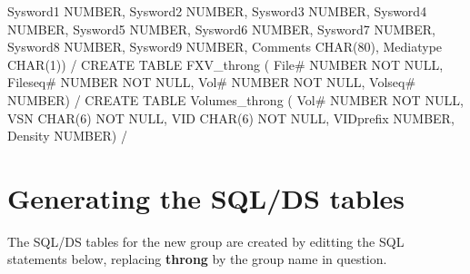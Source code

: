 \begin{Fighere}
\begin{minipage}[t]{.494\linewidth}
\begin{XMP}
                            Sysword1 NUMBER,
                            Sysword2 NUMBER,
                            Sysword3 NUMBER,
                            Sysword4 NUMBER,
                            Sysword5 NUMBER,
                            Sysword6 NUMBER,
                            Sysword7 NUMBER,
                            Sysword8 NUMBER,
                            Sysword9 NUMBER,
                            Comments CHAR(80),
                            Mediatype CHAR(1))
/
CREATE TABLE FXV_throng ( File# NUMBER NOT NULL,
                          Fileseq# NUMBER NOT NULL,
                          Vol# NUMBER NOT NULL,
                          Volseq# NUMBER)
/
CREATE TABLE Volumes_throng ( Vol# NUMBER NOT NULL,
                              VSN CHAR(6) NOT NULL,
                              VID CHAR(6) NOT NULL,
                              VIDprefix NUMBER,
                              Density NUMBER)
/
\end{XMP}
\end{minipage}
\end{Fighere}
\section{Generating the SQL/DS tables}

The SQL/DS tables for the new group are created by editting the
SQL statements below, replacing {\bf throng}
by the group name in question.

